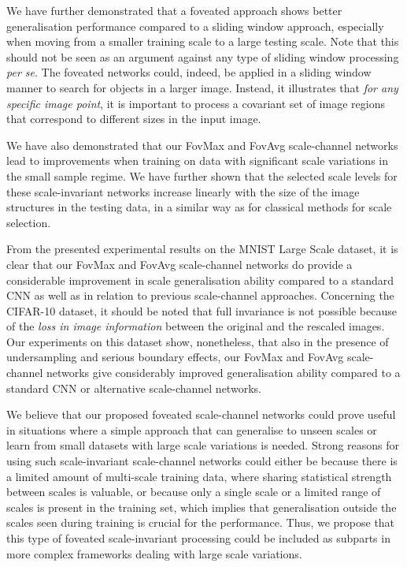 \documentclass[twocolumn,runningheads]{svjour3}
\begin{document}
We have further demonstrated that a foveated approach shows better generalisation performance compared to a sliding window approach, especially when moving from a smaller training scale to a large testing scale. Note that this should not be seen as an argument against any type of sliding window processing \emph{per se}. The foveated networks could, indeed, be applied in a sliding window manner to search for objects in a larger image. Instead, it illustrates that \emph{for any specific image point}, it is important to process a covariant set of image regions that correspond to different sizes in the input image. 

We have also demonstrated that our Fov\-Max and Fov\-Avg scale-channel
networks lead to improvements when training on data with significant
scale variations in the small sample regime.
We have further shown that the selected scale levels for these scale-invariant networks increase linearly with the size of the image
structures in the testing data, in a similar way as for classical
methods for scale selection. 

From the presented experimental results on the MNIST Large Scale dataset, 
it is clear that our Fov\-Max
and Fov\-Avg scale-channel networks do provide a
considerable improvement in scale generalisation ability compared to a
standard CNN as well as in relation to previous scale-channel
approaches.
Concerning the CIFAR-10 dataset, it should be noted that full invariance is not possible  because of the \emph{loss in image information} between the original and the rescaled images. 
Our experiments on this dataset show, nonetheless, that also in the presence of undersampling and serious boundary effects,
our Fov\-Max and Fov\-Avg scale-channel networks give considerably
improved generalisation ability compared to a standard CNN or alternative scale-channel networks. 

We believe that our proposed foveated scale-channel networks
could prove useful in situations where a simple approach that can
generalise to unseen scales or learn from small datasets with large
scale variations is needed.
Strong reasons for using such scale-invariant scale-channel networks
could either be because there is a limited amount of
multi-scale training data, where sharing statistical strength between
scales is valuable, or because only a single scale or a limited range of
scales is present in the training set, which implies that
generalisation outside the scales seen during training is crucial for
the performance.
Thus, we propose that this type of foveated scale-invariant
processing could be included as subparts in more complex
frameworks dealing with large scale variations.
\end{document}
